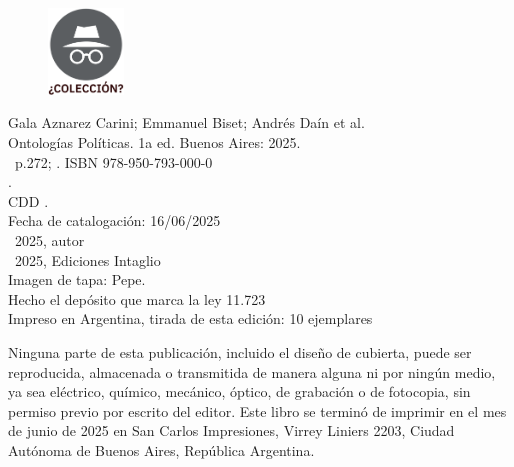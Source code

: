 \newpage
\thispagestyle{empty}
\begin{figure}[t]
\centering
\vspace{-10mm}
\includegraphics[width=20mm]{./media/desconocido.png}\\
\end{figure}

\noindent Gala Aznarez Carini; Emmanuel Biset; Andrés Daín et al. \\
\noindent Ontologías Políticas. 1a ed. Buenos Aires: 2025.\\
\noindent \ztotpages\ p.272; \valorEspecifico. ISBN 978-950-793-000-0 \\
. \\
\noindent CDD .\\
\noindent Fecha de catalogación: 16/06/2025 \\
\noindent \textcopyright~2025, autor \\
\noindent \textcopyright~2025, Ediciones Intaglio\\
\noindent Imagen de tapa: Pepe.\\
\noindent Hecho el depósito que marca la ley 11.723\\
\noindent Impreso en Argentina, tirada de esta edición: 10 ejemplares\\

\vfill

\noindent {}\bigskip

\noindent Ninguna parte de esta publicación, incluido el diseño de cubierta, puede ser reproducida, almacenada o transmitida de manera alguna ni por ningún medio, ya sea eléctrico, químico, mecánico, óptico, de grabación o de fotocopia, sin permiso previo por escrito del editor. Este libro se terminó de imprimir en el mes de junio de 2025 en San Carlos Impresiones, Virrey Liniers 2203, Ciudad Autónoma de Buenos Aires, República Argentina.
